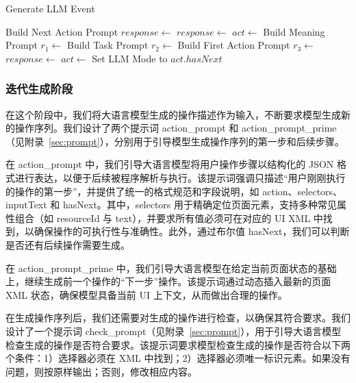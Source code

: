 \documentclass[twocolumn, 10pt]{article}
\begin{document}
\begin{algorithm}[t]
\caption{Generate LLM Event}
\label{alg:generate_event}
\begin{algorithmic}[1]
          \State Build Next Action Prompt
          \State $response \gets$ 
          \State $response \gets$ 
          \State $act \gets$ 
        \Else
          \State Build Meaning Prompt
          \State $r_1 \gets$ 
          \State Build Task Prompt
          \State $r_2 \gets$ 
          \State Build First Action Prompt
          \State $r_3 \gets$ 
          \State $response \gets$ 
          \State $act \gets$ 
    \EndIf
    \State Set LLM Mode to $act.hasNext$
    \State \Return {}
\EndFunction
\end{algorithmic}
\end{algorithm}

\subsubsection{迭代生成阶段}
\label{sec:iterative_generate}

在这个阶段中，我们将大语言模型生成的操作描述作为输入，不断要求模型生成新的操作序列。我们设计了两个提示词 action\_prompt 和 action\_prompt\_prime（见附录~\ref{sec:prompt}），分别用于引导模型生成操作序列的第一步和后续步骤。

在 action\_prompt 中，我们引导大语言模型将用户操作步骤以结构化的 JSON 格式进行表达，以便于后续被程序解析与执行。该提示词强调只描述“用户刚刚执行的操作的第一步”，并提供了统一的格式规范和字段说明，如 action、selectors、inputText 和 hasNext。其中，selectors 用于精确定位页面元素，支持多种常见属性组合（如 resourceId 与 text），并要求所有值必须可在对应的 UI XML 中找到，以确保操作的可执行性与准确性。此外，通过布尔值 hasNext，我们可以判断是否还有后续操作需要生成。

在 action\_prompt\_prime 中，我们引导大语言模型在给定当前页面状态的基础上，继续生成前一个操作的“下一步”操作。该提示词通过动态插入最新的页面 XML 状态，确保模型具备当前 UI 上下文，从而做出合理的操作。

在生成操作序列后，我们还需要对生成的操作进行检查，以确保其符合要求。我们设计了一个提示词 check\_prompt（见附录~\ref{sec:prompt}），用于引导大语言模型检查生成的操作是否符合要求。该提示词要求模型检查生成的操作是否符合以下两个条件：1）选择器必须在 XML 中找到；2）选择器必须唯一标识元素。如果没有问题，则按原样输出；否则，修改相应内容。
\end{document}
